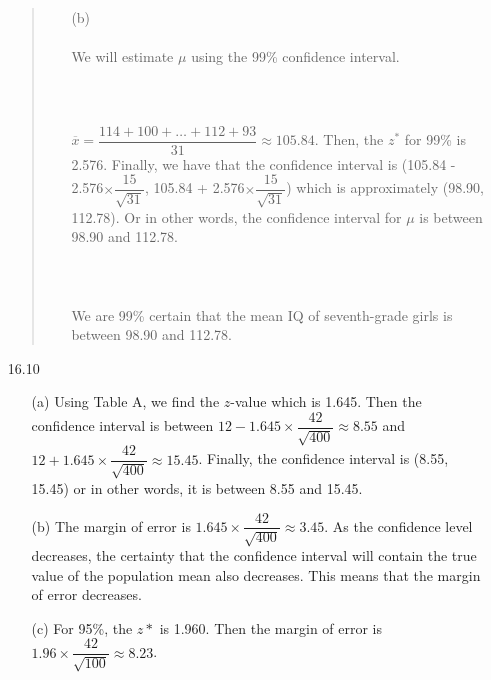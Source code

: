\documentclass[11pt, a4paper]{article}
\newcommand\und[1]{\underline{\smash{#1}}}
\begin{document}
\begin{itemize}
\begin{quote}
\begin{itemize}
\item[]

\item[(b)]
\und{\textbf{PLAN}}\\\\
We will estimate $\mu$ using the 99\% confidence interval.\\\\

\und{\textbf{SOLVE}}\\\\
$\overline{x} = \dfrac{114 + 100 + \dots + 112 + 93}{31} \approx 105.84$.
Then, the $z^*$ for 99\% is 2.576. Finally, we have that the confidence
interval is (105.84 - 2.576$\times \dfrac{15}{\sqrt{31}}$, 105.84 + 2.576$\times \dfrac{15}{\sqrt{31}}$) which is approximately
(98.90, 112.78). Or in other words, the confidence interval for $\mu$ is between 98.90 and 112.78.\\\\

\und{\textbf{SOLVE}}\\\\
We are 99\% certain that the mean IQ of seventh-grade girls is between
98.90 and 112.78.
\end{itemize}
\end{quote}

\newpage

\item[16.10]
\begin{itemize}
\item[(a)]
Using Table A, we find the $z$-value which is 1.645.
Then the confidence interval is between $12 - 1.645 \times \dfrac{42}{\sqrt{400}} \approx 8.55$
and $12 + 1.645 \times \dfrac{42}{\sqrt{400}} \approx 15.45$. Finally,
the confidence interval is (8.55, 15.45) or in other words, it is between
8.55 and 15.45.

\item[]

\item[(b)]
The margin of error is $1.645 \times \dfrac{42}{\sqrt{400}} \approx 3.45$.
As the confidence level decreases, the certainty that the confidence interval
will contain the true value of the population mean also decreases. This means
that the margin of error decreases.

\item[]

\item[(c)]
For 95\%, the $z*$ is 1.960. Then the margin of error is $1.96 \times \dfrac{42}{\sqrt{100}} \approx 8.23$.


\end{itemize}
\end{itemize}
\end{document}
